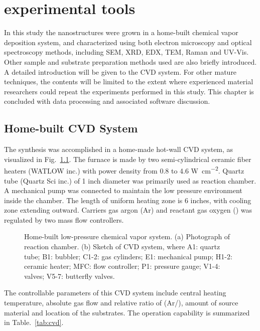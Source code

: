 
\chapter{experimental tools}

In this study the nanostructures were grown in a home-built chemical vapor deposition system, and characterized using both electron microscopy and optical spectroscopy methods, including SEM, XRD, EDX, TEM, Raman and UV-Vis. Other sample and substrate preparation methods used are also briefly introduced. A detailed introduction will be given to the CVD system. For other mature techniques, the contents will be limited to the extent where experienced material researchers could repeat the experiments performed in this study. This chapter is concluded with data processing and associated software discussion. 


\section{Home-built CVD System}

The synthesis was accomplished in a home-made hot-wall CVD system, as visualized in Fig.~\ref{fig:ch2cvd}. The furnace is made by two semi-cylindrical ceramic fiber heaters (WATLOW inc.) with power density from 0.8 to 4.6 \si{W cm^{-2}}. Quartz tube (Quartz Sci inc.) of 1 inch diameter was primarily used as reaction chamber. A mechanical pump was connected to maintain the low pressure environment inside the chamber. The length of uniform heating zone is 6 inches, with cooling zone extending outward. Carriers gas argon (Ar) and reactant gas oxygen () was regulated by two mass flow controllers.

\begin{figure}[htb]
\centering
{}

\caption[CVD system]{Home-built low-pressure chemical vapor system. (a) Photograph of reaction chamber. (b) Sketch of CVD system, where A1: quartz tube; B1: bubbler; C1-2: gas cylinders; E1: mechanical pump; H1-2: ceramic heater; MFC: flow controller; P1: pressure gauge; V1-4: valves; V5-7: butterfly valves.}
\label{fig:ch2cvd}
\end{figure}

The controllable parameters of this CVD system include central heating temperature, absolute gas flow and relative ratio of (Ar/), amount of source material and location of the substrates. The operation capability is summarized in Table.~\ref{tab:cvd}.

